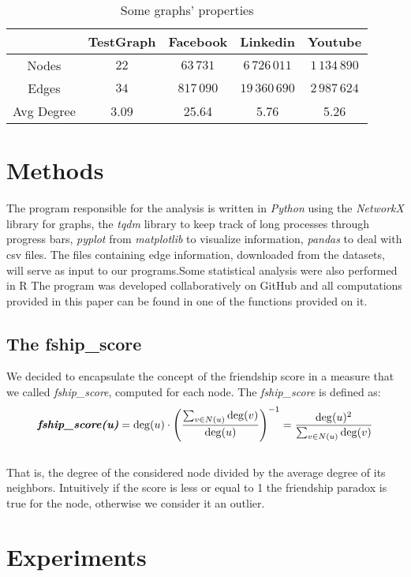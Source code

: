 \documentclass{article}
\begin{document}
\begin{table}[ht]
\centering
\begin{tabular}{|c|c|c|c|c|}
\hline
& TestGraph & Facebook & Linkedin & Youtube \\ \hline
Nodes & $22$ & $63\,731$ & $6\,726\,011$ & $1\,134\,890$\\ \hline
Edges & $34$ & $817\,090$ & $19\,360\,690$ & $2\,987\,624$ \\ \hline
Avg Degree & 3.09 & 25.64 &  5.76 & 5.26 \\ \hline 
\end{tabular}
\caption{Some graphs' properties}
\end{table} 

\section{Methods}
The program responsible for the analysis is written in \textit{Python} using the \textit{NetworkX} library for graphs, the \textit{tqdm} library to keep track of long processes through progress bars, \textit{pyplot} from \textit{matplotlib} to visualize information, \textit{pandas} to deal with csv files. The files containing edge information, downloaded from the datasets, will serve as input to our programs.Some statistical analysis were also performed in R
The program was developed collaboratively on GitHub\cite{Github_repo} and all computations provided in this paper can be found in one of the functions provided on it.

\subsection{The fship\_score}
We decided to encapsulate the concept of the friendship score in a measure that we called \textit{fship\_score}, computed for each node. 
The \textit{fship\_score} is defined as:
\\\[
\textit{\textbf{fship\_score(u)}} = \deg(u) \cdot \left( \frac{\sum_{v \in N(u)} \deg(v)}{\deg(u)} \right)^{-1} =
\frac{\deg(u)^{2}}{\sum_{v \in N(u)} \deg(v)}
\]\\
That is, the degree of the considered node divided by the average degree of its neighbors. Intuitively if the score is less or equal to 1 the friendship paradox is true for the node, otherwise we consider it an outlier.


\section{Experiments}
\end{document}
